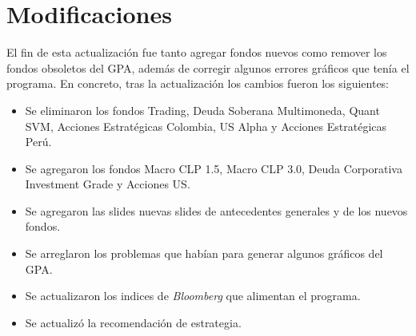 \documentclass{article}
\begin{document}
\section{Modificaciones}
El fin de esta actualización fue tanto agregar fondos nuevos como remover los fondos obsoletos del GPA, además de corregir algunos errores gráficos que tenía el programa. En concreto, tras la actualización los cambios fueron los siguientes:
\begin{itemize}

\item Se eliminaron los fondos Trading, Deuda Soberana Multimoneda, Quant SVM, Acciones Estratégicas Colombia, US Alpha y Acciones Estratégicas Perú.

\item Se agregaron los fondos Macro CLP 1.5, Macro CLP 3.0, Deuda Corporativa Investment Grade y Acciones US.

\item Se agregaron las slides nuevas slides de antecedentes generales y de los nuevos fondos.

\item Se arreglaron los problemas  que habían para generar algunos gráficos del GPA.

\item Se actualizaron los indices de \emph{Bloomberg} que alimentan el programa.

\item Se actualizó la recomendación de estrategia.

\end{itemize}
\end{document}
